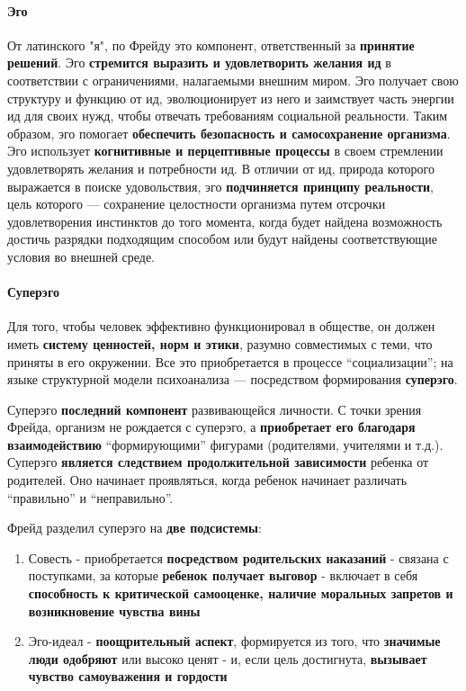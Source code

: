 \documentclass{article}
\begin{document}
\begin{flushleft}
\paragraph{Эго} От латинского "я", по Фрейду это компонент, ответственный за \textbf{принятие решений}. Эго \textbf{стремится выразить и удовлетворить желания ид} в соответствии с ограничениями, налагаемыми внешним миром. Эго получает свою структуру и функцию от ид, эволюционирует из него и заимствует часть энергии ид для своих нужд, чтобы отвечать требованиям социальной реальности. Таким образом, эго помогает \textbf{обеспечить безопасность и самосохранение организма}. Эго использует \textbf{когнитивные и перцептивные процессы} в своем стремлении удовлетворять желания и потребности ид. В отличии от ид, природа которого выражается в поиске удовольствия, эго \textbf{подчиняется принципу реальности}, цель которого — сохранение целостности организма путем отсрочки удовлетворения инстинктов до того момента, когда будет найдена возможность достичь разрядки подходящим способом или будут найдены соответствующие условия во внешней среде.

\paragraph{Суперэго}

Для того, чтобы человек эффективно функционировал в обществе, он должен иметь \textbf{систему ценностей, норм и этики}, разумно совместимых с теми, что приняты в его окружении. Все это приобретается в процессе “социализации”; на языке структурной модели психоанализа — посредством формирования \textbf{суперэго}.

Суперэго \textbf{последний компонент} развивающейся личности. С точки зрения Фрейда, организм не рождается с суперэго, а \textbf{приобретает его благодаря взаимодействию} “формирующими” фигурами (родителями, учителями и т.д.). Суперэго \textbf{является следствием продолжительной зависимости} ребенка от родителей. Оно начинает проявляться, когда ребенок начинает различать “правильно” и “неправильно”.

Фрейд разделил суперэго на \textbf{две подсистемы}:

\begin{enumerate}
    \item Совесть - приобретается \textbf{посредством родительских наказаний} - связана с поступками, за которые \textbf{ребенок получает выговор} - включает в себя \textbf{способность к критической самооценке, наличие моральных запретов и возникновение чувства вины}
    \item Эго-идеал - \textbf{поощрительный аспект}, формируется из того, что \textbf{значимые люди одобряют} или высоко ценят - и, если цель достигнута, \textbf{вызывает чувство самоуважения и гордости}
\end{enumerate}


\end{flushleft}
\end{document}
